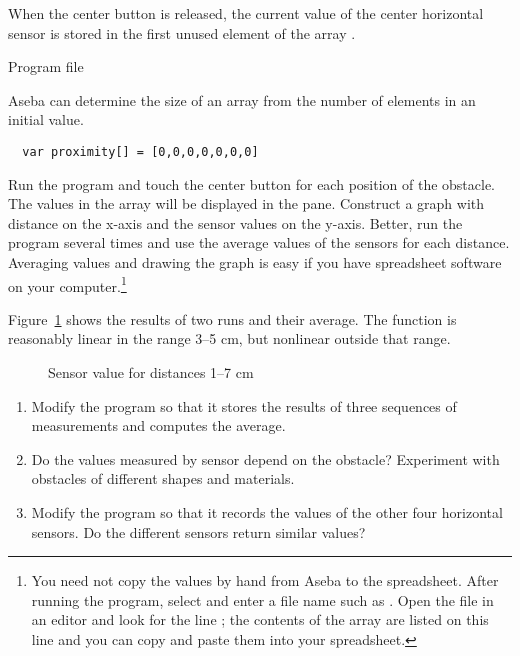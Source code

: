 
When the center button is released, the current value of the center
horizontal sensor is stored in the first unused element of the
array .


{\raggedleft \hfill Program file }

Aseba can determine the size of an array from the number of elements in
an initial value.

\begin{verbatim}
  var proximity[] = [0,0,0,0,0,0,0]
\end{verbatim}


Run the program and touch the center button for each position of the
obstacle. The values in the array  will be displayed in the
 pane. Construct a graph with distance on the x-axis and
the sensor values on the y-axis. Better, run the program several times
and use the average values of the sensors for each distance. Averaging
values and drawing the graph is easy if you have spreadsheet software on
your computer.\footnote{You need not copy the values by hand from Aseba
to the spreadsheet. After running the program, select  and enter a file name such as . Open the
file  in an editor and look for the line
; the contents of the array are listed on this
line and you can copy and paste them into your spreadsheet.}

Figure~\ref{fig.nonlinear} shows the results of two runs and their
average. The function is reasonably linear in the range 3--5 cm, but
nonlinear outside that range.


\begin{figure}
\caption{Sensor value for distances 1--7 cm}\label{fig.nonlinear}
\end{figure}


\begin{enumerate}
\item Modify the program so that it stores the results of three
sequences of measurements and computes the average.

\item Do the values measured by sensor depend on the obstacle?
Experiment with obstacles of different shapes and materials.

\item Modify the program so that it records the values of the other four
horizontal sensors. Do the different sensors return similar values?
 
\end{enumerate}

